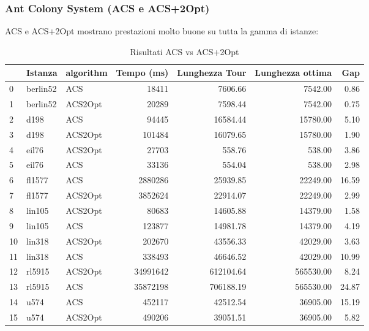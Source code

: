 \subsubsection{Ant Colony System (ACS e ACS+2Opt)}
ACS e ACS+2Opt mostrano prestazioni molto buone su tutta la gamma di istanze:


\begin{table}[H]
	\centering
	\caption{Risultati ACS vs ACS+2Opt}
	\begin{tabular}{lllrrrr}
		\toprule
		   & Istanza  & algorithm & Tempo (ms) & Lunghezza Tour & Lunghezza ottima & Gap   \\
		\midrule
		0  & berlin52 & ACS       & 18411      & 7606.66        & 7542.00          & 0.86  \\
		1  & berlin52 & ACS2Opt   & 20289      & 7598.44        & 7542.00          & 0.75  \\
		2  & d198     & ACS       & 94445      & 16584.44       & 15780.00         & 5.10  \\
		3  & d198     & ACS2Opt   & 101484     & 16079.65       & 15780.00         & 1.90  \\
		4  & eil76    & ACS2Opt   & 27703      & 558.76         & 538.00           & 3.86  \\
		5  & eil76    & ACS       & 33136      & 554.04         & 538.00           & 2.98  \\
		6  & fl1577   & ACS       & 2880286    & 25939.85       & 22249.00         & 16.59 \\
		7  & fl1577   & ACS2Opt   & 3852624    & 22914.07       & 22249.00         & 2.99  \\
		8  & lin105   & ACS2Opt   & 80683      & 14605.88       & 14379.00         & 1.58  \\
		9  & lin105   & ACS       & 123877     & 14981.78       & 14379.00         & 4.19  \\
		10 & lin318   & ACS2Opt   & 202670     & 43556.33       & 42029.00         & 3.63  \\
		11 & lin318   & ACS       & 338493     & 46646.52       & 42029.00         & 10.99 \\
		12 & rl5915   & ACS2Opt   & 34991642   & 612104.64      & 565530.00        & 8.24  \\
		13 & rl5915   & ACS       & 35872198   & 706188.19      & 565530.00        & 24.87 \\
		14 & u574     & ACS       & 452117     & 42512.54       & 36905.00         & 15.19 \\
		15 & u574     & ACS2Opt   & 490206     & 39051.51       & 36905.00         & 5.82  \\
		\bottomrule
	\end{tabular}
\end{table}

